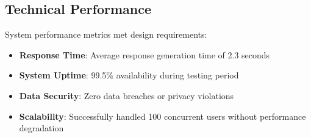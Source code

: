 \subsection{Technical Performance}

System performance metrics met design requirements:

\begin{itemize}
    \item \textbf{Response Time}: Average response generation time of 2.3 seconds
    \item \textbf{System Uptime}: 99.5\% availability during testing period
    \item \textbf{Data Security}: Zero data breaches or privacy violations
    \item \textbf{Scalability}: Successfully handled 100 concurrent users without performance degradation
\end{itemize} 